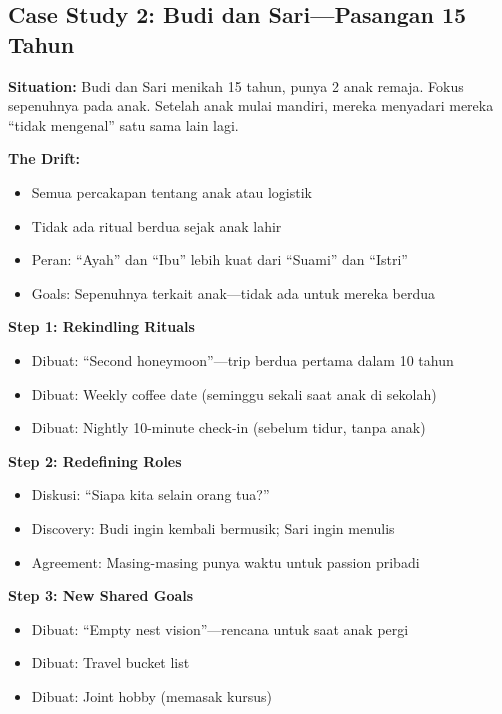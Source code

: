 \subsection{Case Study 2: Budi dan Sari---Pasangan 15 Tahun}

\begin{praktikbox}[Background]
\textbf{Situation:} Budi dan Sari menikah 15 tahun, punya 2 anak remaja. Fokus sepenuhnya pada anak. Setelah anak mulai mandiri, mereka menyadari mereka ``tidak mengenal'' satu sama lain lagi.

\textbf{The Drift:}
\begin{itemize}
    \item Semua percakapan tentang anak atau logistik
    \item Tidak ada ritual berdua sejak anak lahir
    \item Peran: ``Ayah'' dan ``Ibu'' lebih kuat dari ``Suami'' dan ``Istri''
    \item Goals: Sepenuhnya terkait anak---tidak ada untuk mereka berdua
\end{itemize}
\end{praktikbox}

\begin{praktikbox}
\textbf{Step 1: Rekindling Rituals}
\begin{itemize}
    \item Dibuat: ``Second honeymoon''---trip berdua pertama dalam 10 tahun
    \item Dibuat: Weekly coffee date (seminggu sekali saat anak di sekolah)
    \item Dibuat: Nightly 10-minute check-in (sebelum tidur, tanpa anak)
\end{itemize}

\textbf{Step 2: Redefining Roles}
\begin{itemize}
    \item Diskusi: ``Siapa kita selain orang tua?''
    \item Discovery: Budi ingin kembali bermusik; Sari ingin menulis
    \item Agreement: Masing-masing punya waktu untuk passion pribadi
\end{itemize}

\textbf{Step 3: New Shared Goals}
\begin{itemize}
    \item Dibuat: ``Empty nest vision''---rencana untuk saat anak pergi
    \item Dibuat: Travel bucket list
    \item Dibuat: Joint hobby (memasak kursus)
\end{itemize}
\end{praktikbox}

